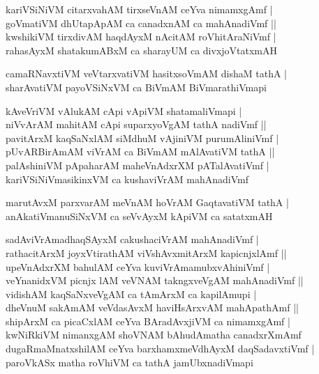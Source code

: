 \documentclass[twoside,12pt,openright]{book}
\newcounter{shloka}[chapter]
\begin{document}
\begin{shloka}
kariVSiNiVM citarxvahAM tirxseVnAM ceYva nimamxgAmf |\\
goVmatiVM dhUtapApAM ca canadxnAM ca mahAnadiVmf ||\\
kwshikiVM tirxdivAM haqdAyxM nAcitAM roVhitAraNiVmf |\\
rahasAyxM shatakumABxM ca sharayUM ca divxjoVtatxmAH
\end{shloka}

\begin{shloka}
camaRNavxtiVM veVtarxvatiVM hasitxsoVmAM dishaM tathA |\\
sharAvatiVM payoVSiNxVM ca BiVmAM BiVmarathiVmapi
\end{shloka}

\begin{shloka}
kAveVriVM vAlukAM cApi vApiVM shatamaliVmapi |\\
niVvArAM mahitAM cApi suparxyoVgAM tathA nadiVmf ||\\
pavitArxM kaqSaNxlAM siMdhuM vAjiniVM purumAliniVmf |\\
pUvARBirAmAM viVrAM ca BiVmAM mAlAvatiVM tathA ||\\
palAshiniVM pApaharAM maheVnAdxrXM pATalAvatiVmf |\\
kariVSiNiVmasikinxVM ca kushaviVrAM mahAnadiVmf
\end{shloka}

\begin{shloka}
marutAvxM parxvarAM meVnAM hoVrAM GaqtavatiVM tathA |\\
anAkatiVmanuSiNxVM ca seVvAyxM kApiVM ca satatxmAH
\end{shloka}

\begin{shloka}
sadAviVrAmadhaqSAyxM cakushaciVrAM mahAnadiVmf |\\
rathacitArxM joyxVtirathAM viVshAvxmitArxM kapicnjxlAmf ||\\
upeVnAdxrXM  bahulAM ceYva kuviVrAmamubxvAhiniVmf |\\
veYnanidxVM picnjx lAM veVNAM takngxveVgAM mahAnadiVmf ||\\
vidishAM kaqSaNxveVgAM ca tAmArxM ca kapilAmupi |\\
dheVnuM sakAmAM veVdasAvxM haviHsArxvAM mahApathAmf ||\\
shipArxM ca picaCxlAM ceYva BAradAvxjiVM ca nimamxgAmf |\\
kwNiRkiVM nimanxgAM shoVNAM bAhudAmatha canadxrXmAmf \\
dugaRmaMnatxshilAM ceYva barxhamxmeVdhAyxM daqSadavxtiVmf |\\
paroVkASx matha roVhiVM ca tathA jamUbxnadiVmapi  
\end{shloka}
\end{document}
